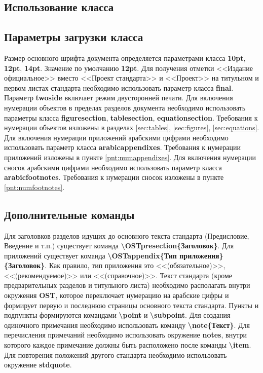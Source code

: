 \documentclass[12pt, twoside, final]{ruost}
\newcommand{\txtcmd}[1]{\textbf{\textbackslash{}#1}}
\begin{document}
	\begin{OST}
		
		\section{Использование класса}
				
			\subsection{Параметры загрузки класса}\label{sec:args}
			
				\point Размер основного шрифта документа определяется параметрами класса  \textbf{10pt}, \textbf{12pt}, \textbf{14pt}. Значение по умолчанию \textbf{12pt}.
				\point Для получения отметки <<Издание официальное>> вместо <<Проект стандарта>> и <<Проект>> на титульном и первом листах стандарта необходимо использовать параметр класса \textbf{final}.
				\point Параметр \textbf{twoside} включает режим двусторонней печати.
				\point Для включения нумерации объектов в пределах разделов документа необходимо использовать параметры класса \textbf{figuresection}, \textbf{tablesection}, \textbf{equationsection}.
					\subpoint Требования к нумерации объектов изложены в разделах \ref{sec:tables}, \ref{sec:figures}, \ref{sec:equations}.
				\point Для включения нумерации приложений арабскими цифрами необходимо использовать параметр класса \textbf{arabicappendixes}.
					\subpoint Требования к нумерации приложений изложены в пункте \ref{pnt:numappendixes}.
				\point Для включения нумерации сносок арабскими цифрами необходимо использовать параметр класса \textbf{arabicfootnotes}.
				\subpoint Требования к нумерации сносок изложены в пункте \ref{pnt:numfootnotes}.
				
			
			\subsection{Дополнительные команды}\label{sec:commands}
			
				\point Для заголовков разделов идущих до основного текста стандарта (Предисловие, Введение и т.п.) существует команда \txtcmd{OSTpresection\{Заголовок\}}.
				\point Для приложений существует команда \txtcmd{OSTappendix\{Тип приложения\} \{Заголовок\}}.
				\subpoint Как правило, тип приложения это <<(обязательное)>>, <<(рекомендуемое)>> или <<(справочное)>>.
				\point Текст стандарта (кроме предварительных разделов и титульного листа) необходимо располагать внутри окружения \textbf{OST}, которое переключает нумерацию на арабские цифры и формирует первую и последнюю страницы основного текста стандарта.
				\point Пункты и подпункты формируются командами \txtcmd{point} и \txtcmd{subpoint}.
				\point Для создания одиночного примечания необходимо использовать команду \txtcmd{note\{Текст\}}.
				\point Для перечисления примечаний необходимо использовать окружение \textbf{notes}, внутри которого каждое примечание должны быть расположено после команды \txtcmd{item}.
				\point Для повторения положений другого стандарта необходимо использовать окружение \textbf{stdquote}.
				

\end{OST}
\end{document}
